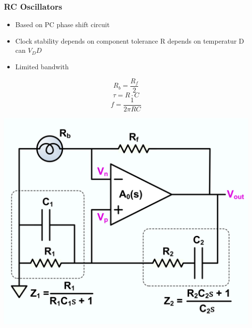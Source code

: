 \subsubsection{RC Oscillators}
\begin{minipage}{0.5\linewidth}
\begin{itemize}
    \item Based on PC phase shift circuit
    \item Clock stability depends on component tolerance
        \subitem R depends on temperatur
        \subitem D can $ V_DD $
    \item Limited bandwith   
\end{itemize}
\[ R_b = \dfrac{R_f}{2} \]
\[ \tau=R\cdot C \]
\[ f = \dfrac{1}{2 \pi RC} \]
\end{minipage}
\begin{minipage}{0.5\linewidth}
    \includegraphics[width=0.9\linewidth]{images/RCOscillator} 
\end{minipage}

